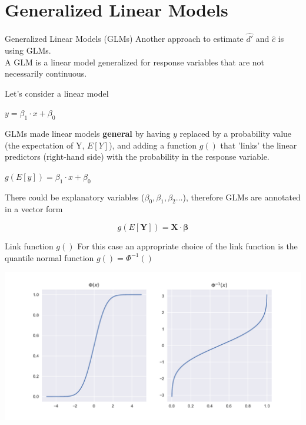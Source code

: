 \documentclass[10pt]{beamer}
\begin{document}
\section{Generalized Linear Models}
\begin{frame}{Generalized Linear Models (GLMs)}
Another approach to estimate $\hat{d'}$ and $\hat{c}$ is using GLMs.\\[5pt]

A GLM is a linear model generalized for response variables that are not necessarily continuous. 

Let's consider a linear model
\begin{center}
$y = \beta_1 \cdot x + \beta_0$
\end{center}

GLMs made linear models \textbf{general} by having $y$ replaced by a probability value (the expectation of Y, $E[Y]$), and adding a function $g()$ that 'links' the linear predictors (right-hand side) with the probability in the response variable.

\begin{center}
$g(E[y])= \beta_1 \cdot x + \beta_0$
\end{center}

There could be  explanatory variables ($\beta_0, \beta_1, \beta_2 \dots$), therefore GLMs are  annotated in a vector form 

$$
g(E[\mathbf{Y}]) = \mathbf{X} \cdot \mathbf{\beta}
$$

\end{frame}



\begin{frame}{Link function $g()$}
For this case an appropriate choice of the link function is the quantile normal function $g() = \Phi^{-1}()$

\begin{center}
\includegraphics[scale=0.5]{figs/linkfun.pdf}
\end{center}

\end{frame}
\end{document}
